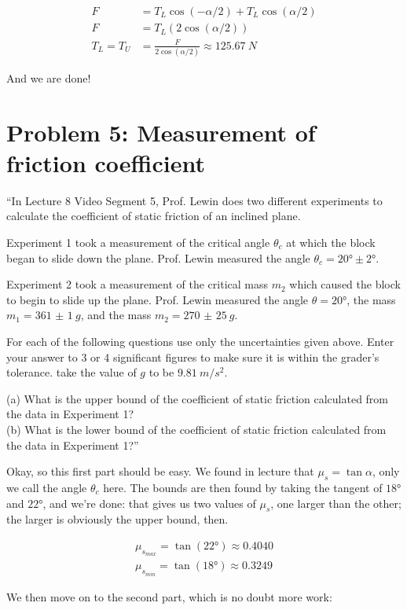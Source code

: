 \documentclass[12pt,a4paper]{report}
\begin{document}
\begin{align}
F &= T_L \cos (-\alpha/2) + T_L \cos (\alpha/2)\\
F &= T_L (2\cos (\alpha/2))\\
T_L = T_U &= \frac{F}{2\cos (\alpha/2)} \approx \SI{125.67}{N}
\end{align}

And we are done!

\section{Problem 5: Measurement of friction coefficient}

``In Lecture 8 Video Segment 5, Prof. Lewin does two different experiments to calculate the coefficient of static friction of an inclined plane.

Experiment 1 took a measurement of the critical angle $\theta_c$ at which the block began to slide down the plane. Prof. Lewin measured the angle $\theta_c = \ang{20} \pm \ang{2}$.

Experiment 2 took a measurement of the critical mass $m_2$ which caused the block to begin to slide up the plane. Prof. Lewin measured the angle $\theta = \ang{20}$, the mass $m_1 = \SI{361(1)}{g}$, and the mass $m_2 = \SI{270(25)}{g}$.

For each of the following questions use only the uncertainties given above. Enter your answer to 3 or 4 significant figures to make sure it is within the grader's tolerance. take the value of $g$ to be $\SI{9.81}{m/s^2}$.

(a) What is the upper bound of the coefficient of static friction calculated from the data in Experiment 1?\\
(b) What is the lower bound of the coefficient of static friction calculated from the data in Experiment 1?''

Okay, so this first part should be easy. We found in lecture that $\mu_s = \tan \alpha$, only we call the angle $\theta_c$ here. The bounds are then found by taking the tangent of $\ang{18}$ and $\ang{22}$, and we're done: that gives us two values of $\mu_s$, one larger than the other; the larger is obviously the upper bound, then.

\begin{align}
\mu_{s_{max}} = \tan(\ang{22}) \approx 0.4040\\
\mu_{s_{min}} = \tan(\ang{18}) \approx 0.3249
\end{align}

We then move on to the second part, which is no doubt more work:
\end{document}
